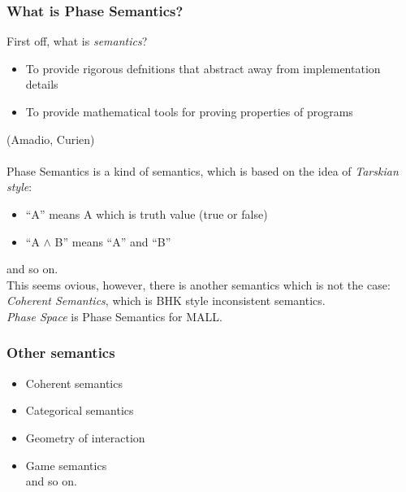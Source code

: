 \documentclass[dvipdfmx,cjk]{beamer}
\theoremstyle{example}
\begin{document}
\begin{frame}
  \frametitle{What is Phase Semantics?}
  First off, what is \textit{semantics}?

  \begin{itemize}
    \item To provide rigorous defnitions that abstract away from implementation
      details
    \item To provide mathematical tools for proving properties of programs
  \end{itemize}
   (Amadio, Curien)\\~\\

  Phase Semantics is a kind of semantics, which is based on the idea of \textit{Tarskian style}: \\

  \begin{itemize}
    \item ``A'' means A which is truth value (true or false)
    \item ``A $\wedge$ B'' means ``A'' and ``B''
  \end{itemize}

  and so on.\\

  This seems ovious, however, there is another semantics which is not the case: \textit{Coherent Semantics}, which is BHK style inconsistent semantics. \\

  \textit{Phase Space} is Phase Semantics for MALL.
  
\end{frame}

\begin{frame}
  \frametitle{Other semantics}

  \begin{itemize}
    \item Coherent semantics
    \item Categorical semantics
    \item Geometry of interaction
    \item Game semantics \\
      and so on.
  \end{itemize}
\end{frame}

\end{document}
